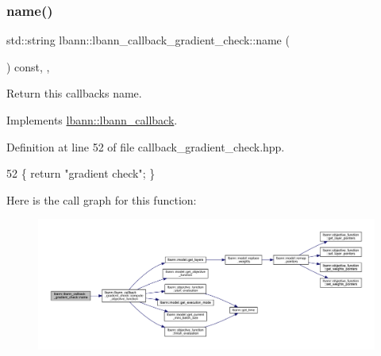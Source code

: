 \subsubsection{\texorpdfstring{name()}{name()}}
{\footnotesize\ttfamily std\+::string lbann\+::lbann\+\_\+callback\+\_\+gradient\+\_\+check\+::name (\begin{DoxyParamCaption}{ }\end{DoxyParamCaption}) const\hspace{0.3cm}{\ttfamily [inline]}, {\ttfamily [override]}, {\ttfamily [virtual]}}

Return this callback\textquotesingle{}s name. 

Implements \hyperlink{classlbann_1_1lbann__callback_a7522c7a14f1d6a1ea762cc2d7248eb3a}{lbann\+::lbann\+\_\+callback}.



Definition at line 52 of file callback\+\_\+gradient\+\_\+check.\+hpp.


\begin{DoxyCode}
52 \{ \textcolor{keywordflow}{return} \textcolor{stringliteral}{"gradient check"}; \}
\end{DoxyCode}
Here is the call graph for this function\+:\nopagebreak
\begin{figure}[H]
\begin{center}
\leavevmode
\includegraphics[width=350pt]{classlbann_1_1lbann__callback__gradient__check_ad068bba7a10853f38cc9f58867dc468b_cgraph}
\end{center}
\end{figure}
\mbox{\label{classlbann_1_1lbann__callback__gradient__check_ab62102d5ab30330386514161b9ee6586}} 

